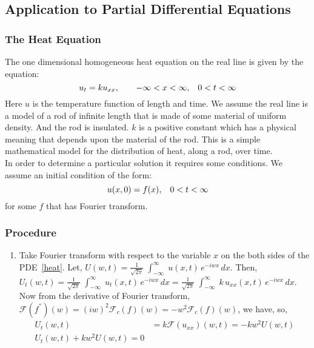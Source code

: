 \message{ !name(ch3_aima331.tex)}\documentclass[aima331_lecturenotes_ku.tex]{subfiles}
\begin{document}
 \subsection{Application to Partial Differential Equations}
 \subsubsection{The Heat Equation}
 The one dimensional homogeneous heat equation on the real line is given by the equation:
 \begin{equation}
   \label{heat}
   u_t =ku_{xx}, \hspace{7mm} -\infty < x < \infty, \hspace{3mm} 0 <t < \infty
 \end{equation}
 Here $u$ is the temperature function of length and time. We assume the real line is a model of a rod of infinite length that is made of some material of uniform density. And the rod is insulated. $k$ is a positive constant which has a physical meaning that depends upon the material of the rod. This is a simple mathematical model for the distribution of heat, along a rod, over time. \\[2mm]
 In order to determine a particular solution it requires some conditions. We assume an initial condition of the form:
 $$u(x,0) = f(x), \hspace{3mm}  0 <t < \infty $$ for some $f$ that has Fourier transform.

 \subsubsection{Procedure}
 \begin{enumerate}
 \item Take Fourier transform with respect to the variable $x$ on the both sides of the PDE~\ref{heat}.
   Let, $\displaystyle U(w,t) = \frac{1}{\sqrt{2\pi}} \; \int_{-\infty}^{\infty} \; u(x,t)\, e^{-iwx}\,dx$. Then, \\[3mm]
   $\displaystyle U_t(w,t) = \frac{1}{\sqrt{2\pi}} \; \int_{-\infty}^{\infty} \; u_t(x,t)\, e^{-iwx}\,dx = \frac{1}{\sqrt{2\pi}} \; \int_{-\infty}^{\infty} \;k\, u_{xx}(x,t)\, e^{-iwx}\,dx$. \\[2mm]
   Now from the derivative of Fourier transform, $\mathcal{F}(f^{''})(w)=(iw)^2\mathcal{F}_c(f)(w)=-w^2\mathcal{F}_c(f)(w)$, we have, so,
   \begin{equation}
     \label{eq:2}
     \begin{aligned}
       U_t(w,t) &= k \mathcal{F}(u_{xx})(w,t) = -kw^2U(w,t) \\[2mm]
       U_t(w,t) + kw^2U(w,t) =0
     \end{aligned}
   \end{equation}

 \end{enumerate}
\end{document}
